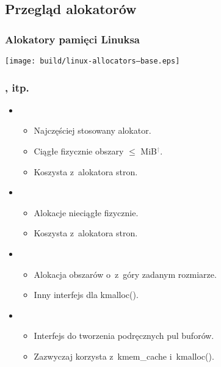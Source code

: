 
\subsection{Przegląd alokatorów}

\begin{frame}
  \frametitle{Alokatory pamięci Linuksa}

  \begin{center}
    \texttt{[image: build/linux-allocators--base.eps]}
  \end{center}
\end{frame}

\begin{frame}
  \frametitle{,  itp.}

  \begin{itemize}
  \item {}
    \begin{itemize}
    \item Najczęściej stosowany alokator.
    \item Ciągłe fizycznie obszary $\le$
      \unit[4]{MiB}\textcolor{gray}{$^\dagger$}.
    \item Koszysta z~alokatora stron.
    \end{itemize}

  \item {}
    \begin{itemize}
    \item Alokacje nieciągłe fizycznie.
    \item Koszysta z~alokatora stron.
    \end{itemize}

  \item {}
    \begin{itemize}
    \item Alokacja obszarów o~z~góry zadanym rozmiarze.
    \item Inny interfejs dla kmalloc().
    \end{itemize}

  \item {}
    \begin{itemize}
    \item Interfejs do tworzenia podręcznych pul buforów.
    \item Zazwyczaj korzysta z~kmem\_cache i~kmalloc().
    \end{itemize}
  \end{itemize}
\end{frame}

